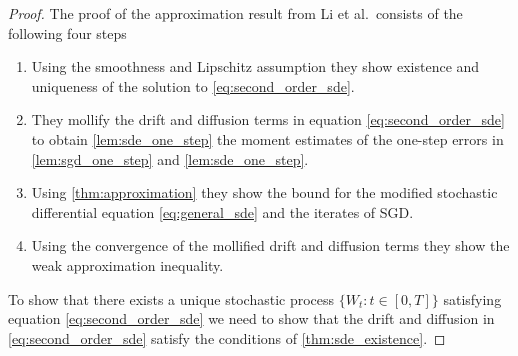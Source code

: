 \documentclass[12pt]{article}
\theoremstyle{definition}
\numberwithin{equation}{section}
\begin{document}
\begin{proof}
  The proof of the approximation result from Li et al.\ consists of the following four steps 
  \begin{enumerate}
    \item Using the smoothness and Lipschitz assumption they show existence and uniqueness of the solution to \eqref{eq:second_order_sde}.
    \item They mollify the drift and diffusion terms in equation \eqref{eq:second_order_sde} to obtain \autoref{lem:sde_one_step} the moment estimates of the one-step errors in \autoref{lem:sgd_one_step} and \autoref{lem:sde_one_step}.
    \item Using \autoref{thm:approximation} they show the bound for the modified stochastic differential equation \eqref{eq:general_sde} and the iterates of SGD.
    \item Using the convergence of the mollified drift and diffusion terms they show the weak approximation inequality.
  \end{enumerate}
  To show that there exists a unique stochastic process $\{W_t: t \in [0,T]\}$ satisfying equation \eqref{eq:second_order_sde} we need to show that the drift and diffusion in \eqref{eq:second_order_sde} satisfy the conditions of \autoref{thm:sde_existence}.


\end{proof}
\end{document}
